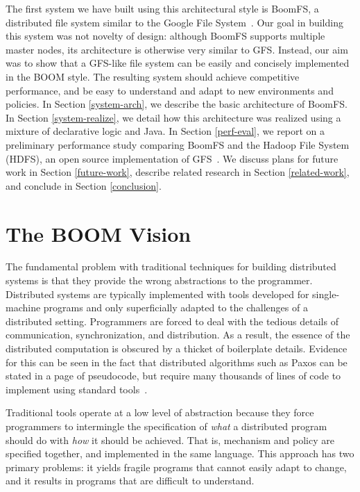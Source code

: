 \documentclass[twocolumn]{article}
\begin{document}
The first system we have built using this architectural style is
BoomFS, a distributed file system similar to the Google File
System~\cite{gfs}. Our goal in building this system was not novelty of
design: although BoomFS supports multiple master nodes, its
architecture is otherwise very similar to GFS. Instead, our aim was to
show that a GFS-like file system can be easily and concisely
implemented in the BOOM style. The resulting system should achieve
competitive performance, and be easy to understand and adapt to new
environments and policies. In Section \ref{system-arch}, we describe
the basic architecture of BoomFS. In Section \ref{system-realize}, we
detail how this architecture was realized using a mixture of
declarative logic and Java. In Section \ref{perf-eval}, we report on a
preliminary performance study comparing BoomFS and the Hadoop File
System (HDFS), an open source implementation of
GFS~\cite{hdfs-arch}. We discuss plans for future work in Section
\ref{future-work}, describe related research in Section
\ref{related-work}, and conclude in Section \ref{conclusion}.

\section{The BOOM Vision}
\label{boom-vision}
The fundamental problem with traditional techniques for building
distributed systems is that they provide the wrong abstractions to the
programmer. Distributed systems are typically implemented with tools
developed for single-machine programs and only superficially adapted
to the challenges of a distributed setting. Programmers are forced to
deal with the tedious details of communication, synchronization, and
distribution. As a result, the essence of the distributed computation
is obscured by a thicket of boilerplate details. Evidence for this can
be seen in the fact that distributed algorithms such as Paxos can be
stated in a page of pseudocode, but require many thousands of lines of
code to implement using standard tools~\cite{paxos-made-live}.

Traditional tools operate at a low level of abstraction because they
force programmers to intermingle the specification of \emph{what} a
distributed program should do with \emph{how} it should be
achieved. That is, mechanism and policy are specified together, and
implemented in the same language. This approach has two primary
problems: it yields fragile programs that cannot easily adapt to
change, and it results in programs that are difficult to understand.
\end{document}
